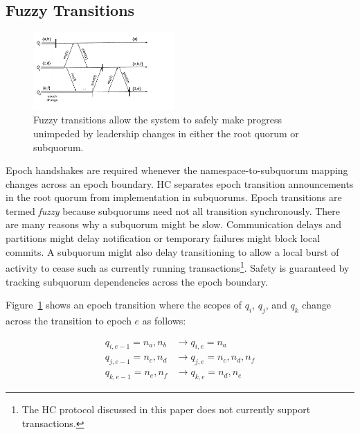 \documentclass[10pt,conference]{IEEEtran}
\newcommand{\sub}{subquorum\xspace}
\newcommand{\subs}{subquorums\xspace}
\newcommand{\roo}{root quorum\xspace}
\begin{document}
\subsection{Fuzzy Transitions}
\label{section:fuzzy}


\begin{figure}
    \centering
    \includegraphics[width=0.48\textwidth]{figures/namespaceHandoff}
    \caption{Fuzzy transitions allow the system to safely make progress unimpeded by
    leadership changes in either the \roo or \sub.}
    \label{fig:handoff}
\end{figure}

Epoch handshakes are required whenever the namespace-to-\sub mapping changes across an
epoch boundary.
HC separates epoch transition announcements in the \roo from implementation in \subs.
Epoch transitions are termed \emph{fuzzy} because \subs need not all transition
synchronously.
There are many reasons why a \sub might be slow.
Communication delays and partitions might delay notification or temporary failures might
block local commits.
A \sub might also delay transitioning to allow a local burst of activity to
cease such as currently running transactions\footnote{The HC protocol
discussed in this paper does not currently support transactions.}.
Safety is guaranteed by tracking \sub dependencies across the epoch boundary.

Figure~\ref{fig:handoff} shows an epoch transition where the scopes of
$q_i$, $q_j$, and $q_k$ change across the transition to epoch $e$ as follows:

\begin{align*}
  \label{eq:3}
  q_{i,e-1} = n_a, n_b  &\longrightarrow q_{i,e} = n_a\\
  q_{j,e-1} = n_c, n_d  &\longrightarrow q_{j,e} = n_c,n_d,n_f\\
  q_{k,e-1} = n_e, n_f  &\longrightarrow q_{k,e} = n_d,n_e
\end{align*}
\end{document}
